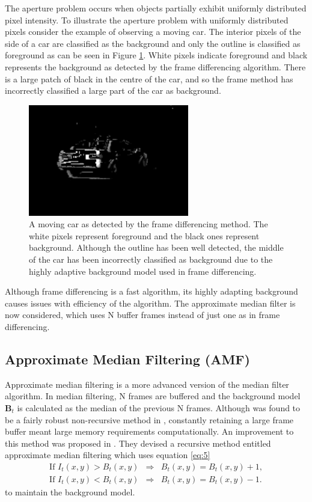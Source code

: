 The aperture problem occurs when objects partially exhibit uniformly distributed pixel intensity. To illustrate the aperture problem with uniformly distributed pixels consider the example of observing a moving car. The interior pixels of the side of a car are classified as the background and only the outline is classified as foreground as can be seen in Figure \ref{fig:carff}. White pixels indicate foreground and black represents the background as detected by the frame differencing algorithm. There is a large patch of black in the centre of the car, and so the frame method has incorrectly classified a large part of the car as background. 

\begin{figure}[h]
  \centering
  \includegraphics[width = 7cm]{carff.png}
  \caption{A moving car as detected by the frame differencing method. The white pixels represent foreground and the black ones represent background. Although the outline has been well detected, the middle of the car has been incorrectly classified as background due to the highly adaptive background model used in frame differencing.}
  \label{fig:carff}
\end{figure}

Although frame differencing is a fast algorithm, its highly adapting background causes issues with efficiency of the algorithm. The approximate median filter is now considered, which uses N buffer frames instead of just one as in frame differencing.


\subsection{Approximate Median Filtering (AMF)}
\label{sec:approximate-median}

Approximate median filtering is a more advanced version of the median filter algorithm. In median filtering, N frames are buffered and the background model $\pmb{B}_t$ is calculated as the median of the previous N frames. Although was found to be a fairly robust non-recursive method in \cite{gloyer1995video}, constantly retaining a large frame buffer meant large memory requirements computationally. An improvement to this method was proposed in \cite{mcfarlane1995segmentation}. They devised a recursive method entitled approximate median filtering which uses equation \eqref{eq:5} 
%
\begin{eqnarray}
  \label{eq:5}
  \mbox{If } I_t(x,y)  >  B_t(x,y) & \Rightarrow& B_t(x,y) = B_t(x,y) + 1 \nonumber, \\
\mbox{If } I_t(x,y)  <  B_t(x,y) & \Rightarrow& B_t(x,y) = B_t(x,y) - 1 .
\end{eqnarray}
%
to maintain the background model.

